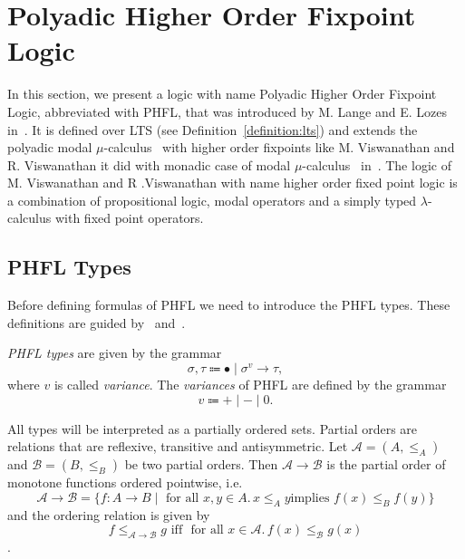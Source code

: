 
\section{Polyadic Higher Order Fixpoint Logic}\label{sec:polyadichigherorderfixpointlogic}

In this section, we present a logic with name Polyadic Higher Order Fixpoint Logic, abbreviated with PHFL, that was
introduced by M. Lange and E. Lozes in~\cite{lange2014capturing}. It is defined over LTS (see
Definition~\ref{definition:lts}) and extends the polyadic modal $\mu$-calculus~\cite{otto1999bisimulation} with
higher order fixpoints like M. Viswanathan and R. Viswanathan it did with monadic case of modal
$\mu$-calculus~\cite{kozen1983results} in~\cite{viswanathan2004higher}. The logic of M. Viswanathan and R
.Viswanathan with name higher order fixed point logic is a combination of propositional logic, modal operators and
a simply typed $\lambda$-calculus with fixed point operators. 

\subsection{PHFL Types}\label{subsec:phflTypes}

Before defining formulas of PHFL we need to introduce the PHFL types. These definitions are guided
by~\cite{viswanathan2004higher} and~\cite{lange2014capturing}.

\begin{definition}
    \emph{PHFL types} are given by the grammar
    \[\sigma, \tau \Coloneqq \bullet \mid \sigma^v \rightarrow \tau,\]
    where $v$ is called \textit{variance}. The \emph{variances} of PHFL are defined by the grammar
    \[v \Coloneqq + \mid - \mid 0.\]
\end{definition}

All types will be interpreted as a partially ordered sets. Partial orders are relations that are reflexive, transitive
and antisymmetric. Let $\mathcal{A} = (A, \leq_A)$ and $\mathcal{B} = (B, \leq_B)$ be two partial orders. Then
$\mathcal{A} \rightarrow \mathcal{B}$ is the partial order of monotone functions ordered pointwise, i.e.
\[\mathcal{A} \rightarrow \mathcal{B} = \{f\colon A\rightarrow B \mid \text{ for all } x,y \in A.\,x\leq_A y \text{
implies }
f(x)
\leq_B f(y)\}\]
and the ordering relation is given by
\[f \leq_{\mathcal{A}\rightarrow\mathcal{B}} g\text{ iff } \text{ for all } x\in \mathcal{A}.\,f(x) \leq_{\mathcal{B}} g
(x)\].

